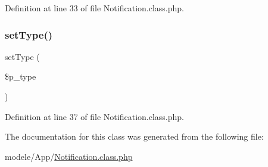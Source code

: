 Definition at line 33 of file Notification.\+class.\+php.

\mbox{\label{class_notification_a52b993e081ed8c1fe0f5ef64d8683c80}} 
\subsubsection{\texorpdfstring{set\+Type()}{setType()}}
{\footnotesize\ttfamily set\+Type (\begin{DoxyParamCaption}\item[{}]{\$p\+\_\+type }\end{DoxyParamCaption})}



Definition at line 37 of file Notification.\+class.\+php.



The documentation for this class was generated from the following file\+:\begin{DoxyCompactItemize}
\item 
modele/\+App/\hyperlink{_notification_8class_8php}{Notification.\+class.\+php}\end{DoxyCompactItemize}
